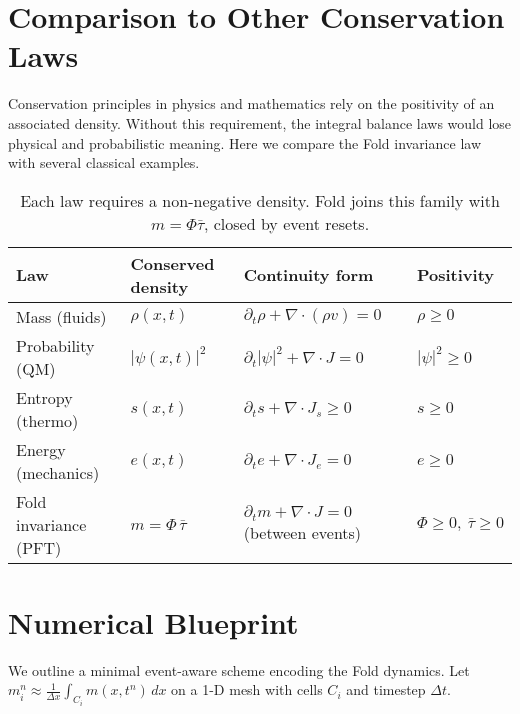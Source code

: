 \documentclass[11pt]{article}
\begin{document}
\section{Comparison to Other Conservation Laws}

Conservation principles in physics and mathematics rely on the 
positivity of an associated density. Without this requirement, the 
integral balance laws would lose physical and probabilistic meaning. 
Here we compare the Fold invariance law with several classical 
examples.

\begin{table}[h!]
\centering
\renewcommand{\arraystretch}{1.2}
\begin{tabularx}{\textwidth}{|l|l|X|l|}
\hline
\textbf{Law} & \textbf{Conserved density} & \textbf{Continuity form} & \textbf{Positivity} \\
\hline
Mass (fluids) & $\rho(x,t)$ & $\partial_t \rho + \nabla\!\cdot(\rho v)=0$ & $\rho \ge 0$ \\
\hline
Probability (QM) & $|\psi(x,t)|^2$ & $\partial_t |\psi|^2 + \nabla\!\cdot J=0$ & $|\psi|^2 \ge 0$ \\
\hline
Entropy (thermo) & $s(x,t)$ & $\partial_t s + \nabla\!\cdot J_s \ge 0$ & $s \ge 0$ \\
\hline
Energy (mechanics) & $e(x,t)$ & $\partial_t e + \nabla\!\cdot J_e=0$ & $e \ge 0$ \\
\hline
Fold invariance (PFT) & $m=\Phi\,\bar{\tau}$ & $\partial_t m + \nabla\!\cdot J=0$ (between events) & $\Phi\ge 0,\ \bar{\tau}\ge 0$ \\
\hline
\end{tabularx}
\caption{Each law requires a non-negative density. Fold joins this family with $m=\Phi\bar{\tau}$, closed by event resets.}
\end{table}


\section{Numerical Blueprint}

We outline a minimal event-aware scheme encoding the Fold dynamics.
Let $m_i^n \approx \frac{1}{\Delta x}\int_{C_i} m(x,t^n)\,dx$ on a 1-D mesh
with cells $C_i$ and timestep $\Delta t$.
\end{document}
